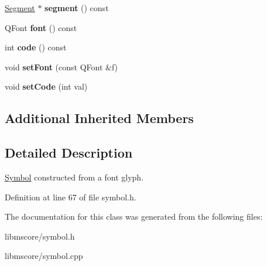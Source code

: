 \begin{DoxyCompactItemize}
\mbox{\label{class_ms_1_1_f_symbol_a2099f87d4947d5db76beeaccd8958323}} 
\hyperlink{class_ms_1_1_segment}{Segment} $\ast$ {\bfseries segment} () const
\item 
\mbox{\label{class_ms_1_1_f_symbol_a26c9514f9827d3488f70127c5fd89032}} 
Q\+Font {\bfseries font} () const
\item 
\mbox{\label{class_ms_1_1_f_symbol_a5fe259c71c4576237b02197b9e164dd9}} 
int {\bfseries code} () const
\item 
\mbox{\label{class_ms_1_1_f_symbol_a45169f573d0fea316f0f7d4cc7b7bb29}} 
void {\bfseries set\+Font} (const Q\+Font \&f)
\item 
\mbox{\label{class_ms_1_1_f_symbol_abe1bed23a077939c00da778f58ef2703}} 
void {\bfseries set\+Code} (int val)
\end{DoxyCompactItemize}
\subsection*{Additional Inherited Members}


\subsection{Detailed Description}
\hyperlink{class_ms_1_1_symbol}{Symbol} constructed from a font glyph. 

Definition at line 67 of file symbol.\+h.



The documentation for this class was generated from the following files\+:\begin{DoxyCompactItemize}
\item 
libmscore/symbol.\+h\item 
libmscore/symbol.\+cpp\end{DoxyCompactItemize}
